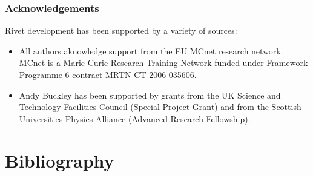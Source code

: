 \documentclass{JHEP3}
\begin{document}
\section{Acknowledgements}
\label{app:acknowledgements}

Rivet development has been supported by a variety of sources:

\begin{itemize}
\item All authors aknowledge support from the EU MCnet research network. MCnet
  is a Marie Curie Research Training Network funded under Framework Programme 6
  contract MRTN-CT-2006-035606.
\item Andy Buckley has been supported by grants from the UK Science and
  Technology Facilities Council (Special Project Grant) and from the Scottish
  Universities Physics Alliance (Advanced Research Fellowship).
\end{itemize}


\cleardoublepage
\part{Bibliography}

{\raggedright
  
}
\end{document}
